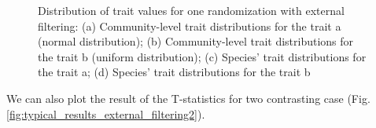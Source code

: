\documentclass[12pt]{article}\usepackage[]{graphicx}\usepackage[]{color}
\newenvironment{knitrout}{}{} %
\begin{document}
\begin{knitrout}
\begin{figure}
{}

\caption[Distribution of trait values for one randomization with external filtering]{Distribution of trait values for one randomization with external filtering: (a) Community-level trait distributions for the trait a (normal distribution); (b) Community-level trait distributions for the trait b (uniform distribution); (c) Species' trait distributions for the trait a; (d) Species' trait distributions for the trait b}\label{fig:typical_results_external_filtering1}
\end{figure}


\end{knitrout}

We can also plot the result of the T-statistics for two contrasting case (Fig. \ref{fig:typical_results_external_filtering2}).
\end{document}

